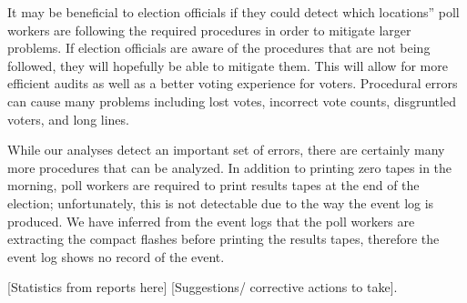 It may be beneficial to election officials if they could detect which locations'' poll workers are following the required procedures in order to mitigate larger problems.  If election officials are aware of the procedures that are not being followed, they will hopefully be able to mitigate them.  This will allow for more efficient audits as well as a better voting experience for voters.  Procedural errors can cause many problems including lost votes, incorrect vote counts, disgruntled voters, and long lines.

While our analyses detect an important set of errors, there are certainly many more procedures that can be analyzed.  In addition to printing zero tapes in the morning, poll workers are required to print results tapes at the end of the election; unfortunately, this is not detectable due to the way the event log is produced.  We have inferred from the event logs that the poll workers are extracting the compact flashes before printing the results tapes, therefore the event log shows no record of the event.  

[Statistics from reports here] [Suggestions/ corrective actions to take].  

